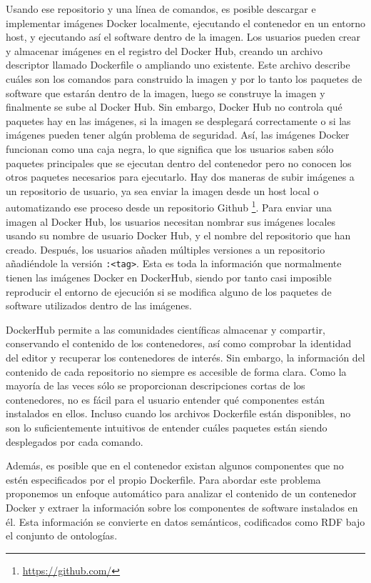 Usando ese repositorio y una línea de comandos, es posible descargar e implementar imágenes Docker localmente, ejecutando el contenedor en un entorno host, y ejecutando así el software dentro de la imagen. Los usuarios pueden crear y almacenar imágenes en el registro del Docker Hub, creando un archivo descriptor llamado Dockerfile o ampliando uno existente.  Este archivo describe cuáles son los comandos para construido la imagen y por lo tanto los paquetes de software que estarán dentro de la imagen, luego se construye la imagen y finalmente se sube al Docker Hub. Sin embargo, Docker Hub no controla qué paquetes hay en las imágenes, si la imagen se desplegará correctamente o si las imágenes pueden tener algún problema de seguridad. 
Así, las imágenes Docker funcionan como una caja negra, lo que significa que los usuarios saben sólo paquetes principales que se ejecutan dentro del contenedor pero no conocen los otros paquetes necesarios para ejecutarlo.
Hay dos maneras de subir imágenes a un repositorio de usuario, ya sea enviar la imagen desde un host local o automatizando ese proceso desde un repositorio Github \footnote{\url{https://github.com/}}. Para enviar una imagen al Docker Hub, los usuarios necesitan nombrar sus imágenes locales usando su nombre de usuario Docker Hub, y el nombre del repositorio que han creado. 
Después, los usuarios añaden múltiples versiones a un repositorio añadiéndole la versión \texttt{:<tag>}. 
Esta es toda la información que normalmente tienen las imágenes Docker en DockerHub, siendo por tanto casi imposible reproducir el entorno de ejecución si se modifica alguno de los paquetes de software utilizados dentro de las imágenes. 


DockerHub permite a las comunidades científicas almacenar y compartir, conservando el contenido de los contenedores, así como comprobar la identidad del editor y recuperar los contenedores de interés. Sin embargo, la información del contenido de cada repositorio no siempre es accesible de forma clara. 
Como la mayoría de las veces sólo se proporcionan descripciones cortas de los contenedores, no es fácil para el usuario entender qué componentes están instalados en ellos. 
Incluso cuando los archivos Dockerfile están disponibles, no son lo suficientemente intuitivos de entender cuáles paquetes están siendo desplegados por cada comando.

Además, es posible que en el contenedor existan algunos componentes que no estén especificados por el propio Dockerfile. Para abordar este problema proponemos un enfoque automático para analizar el contenido de un contenedor Docker y extraer la información sobre los componentes de software instalados en él. Esta información se convierte en datos semánticos, codificados como RDF bajo el conjunto de ontologías.

